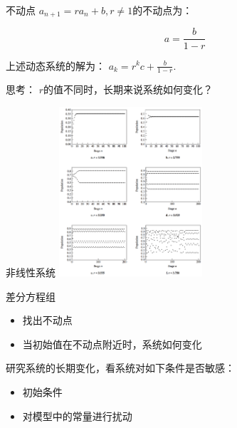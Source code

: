 \documentclass[
  ignorenonframetext,
]{ctexbeamer}
\begin{document}
\begin{frame}{不动点}
\label{ux4e0dux52a8ux70b9-1}
\(a_{n+1} = ra_n + b, r \neq 1\)的不动点为：

\[a = \frac{b}{1-r}\]

上述动态系统的解为： \(a_k=r^kc+\frac{b}{1-r}\).

思考： \(r\)的值不同时，长期来说系统如何变化？
\end{frame}

\begin{frame}{非线性系统}
\label{ux975eux7ebfux6027ux7cfbux7edf}
\includegraphics[width=0.4\textwidth,height=\textheight]{nonlinear.png}
\end{frame}

\begin{frame}{差分方程组}
\label{ux5deeux5206ux65b9ux7a0bux7ec4}
\begin{itemize}
\item
  找出不动点
\item
  当初始值在不动点附近时，系统如何变化
\end{itemize}

研究系统的长期变化，看系统对如下条件是否敏感：

\begin{itemize}
\item
  初始条件
\item
  对模型中的常量进行扰动
\end{itemize}
\end{frame}
\end{document}
